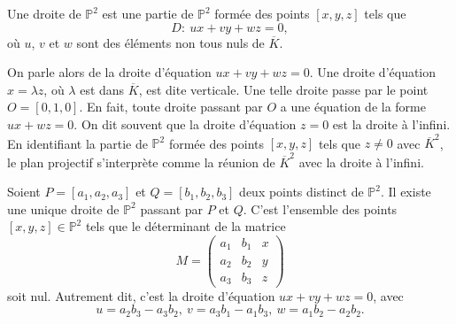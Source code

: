 \begin{definition}
    Une droite de $\mathbb{P}^2$ est une partie de $\mathbb{P}^2$ formée des points $[x,y,z]$ tels que 
    \[
    D :\ ux+vy+wz=0
    ,\] 
    où $u$, $v$ et $w$ sont des éléments non tous nuls de $\overline{K}$.
\end{definition}

On parle alors de la droite d'équation $ux+vy+wz=0$. Une droite d'équation $x=\lambda z$, où $\lambda$ est dans $\overline{K}$, est dite verticale. Une telle droite passe par le point $O = [0,1,0]$. En fait, toute droite passant par $O$ a une équation de la forme $ux+wz=0$. On dit souvent que la droite d'équation $z=0$ est la droite à l'infini. En identifiant la partie de $\mathbb{P}^2$ formée des points $[x,y,z]$ tels que $z \neq 0$ avec $\overline{K}^2$, le plan projectif s'interprète
comme la réunion de $\overline{K}^2$ avec la droite à l'infini.

\begin{lemme}
    \label{lem:lemme2}
    



    Soient $P = \left[ a_1, a_2, a_3 \right]$ et $Q = \left[ b_1, b_2, b_3 \right]$ deux points distinct de $\mathbb{P}^2$. Il existe une unique droite de $\mathbb{P}^2$ passant par $P$ et $Q$. C'est l'ensemble des points $\left[ x, y, z \right] \in \mathbb{P}^2$ tels que le déterminant de la matrice
    \[
        M = 
    \begin{pmatrix}
        a_1 & b_1 & x \\ 
        a_2 & b_2 & y \\
        a_3 & b_3 & z
    \end{pmatrix}
    \] 
    soit nul. Autrement dit, c'est la droite d'équation $ux + vy + wz = 0$, avec
    \[
    u = a_2b_3 - a_3b_2, \ v = a_3b_1 - a_1b_3, \ w = a_1b_2 - a_2b_2
    .\] 
\end{lemme}

